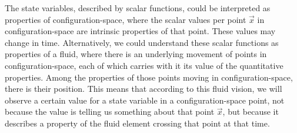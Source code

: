 \documentclass[11pt, a4paper]{article} %
\begin{document}
The state variables, described by scalar functions, could be interpreted as properties of configuration-space, where the scalar values per point $\vec{x}$ in configuration-space are intrinsic properties of that point. These values may change in time. Alternatively, we could understand these scalar functions as properties of a fluid, where there is an underlying movement of points in configuration-space, each of which carries with it its value of the quantitative properties. Among the properties of those points moving in configuration-space, there is their position. This means that according to this fluid vision, we will observe a certain value for a state variable in a configuration-space point, not because the value is telling us something about that point $\vec{x}$, but because it describes a property of the fluid element crossing that point at that time.
\end{document}
